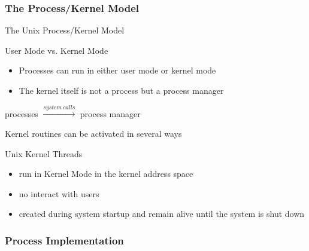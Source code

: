 \subsubsection{The Process/Kernel Model}

\begin{frame}{The Unix Process/Kernel Model}
  \begin{block}{User Mode vs. Kernel Mode}
    \begin{itemize}
    \item Processes can run in either user mode or kernel mode
    \item The kernel itself is not a process but a process manager
    \end{itemize}
  \end{block}
  \begin{center}
    processes $\xrightarrow{system\ calls}$ process manager
  \end{center}
\end{frame}

\begin{frame}
  \begin{block}{Kernel routines can be activated in several ways}
    \begin{center}
    \end{center}
  \end{block}
\end{frame}

\begin{frame}
  \begin{block}{Unix Kernel Threads}
    \begin{itemize}
    \item run in Kernel Mode in the kernel address space
    \item no interact with users
    \item created during system startup and remain alive until the system is
      shut down
    \end{itemize}
  \end{block}
\end{frame}

\subsubsection{Process Implementation}

